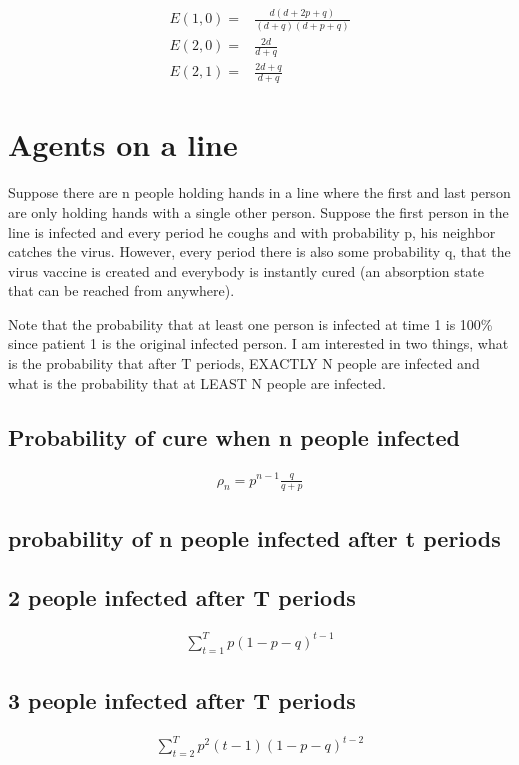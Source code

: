 \documentclass[12pt]{report}
\numberwithin{equation}{section}
\begin{document}
\begin{align*}
E(1,0) = & \frac{d(d+2p+q)}{(d+q)(d+p+q)} \\
E(2,0) = & \frac{2d}{d+q} \\
E(2,1) = & \frac{2d+q}{d+q} 
\end{align*}

\section{Agents on a line}

Suppose there are n people holding hands in a line where the first and last person are only holding hands with a single other person. Suppose the first person in the line is infected and every period he coughs and with probability p, his neighbor catches the virus. However, every period there is also some probability q, that the virus vaccine is created and everybody is instantly cured (an absorption state that can be reached from anywhere).

Note that the probability that at least one person is infected at time 1 is 100\% since patient 1 is the original infected person. I am interested in two things, what is the probability that after T periods, EXACTLY N people are infected and what is the probability that at LEAST N people are infected.


\subsection{Probability of cure when n people infected}

\begin{align}
\rho_n = p^{n-1}\frac{q}{q+p}
\end{align}

\subsection{probability of n people infected after t periods}

\subsection{2 people infected after T periods}

\begin{align}
 \sum_{t=1}^{T}p(1-p-q)^{t-1}
\end{align}

\subsection{3 people infected after T periods}
\begin{align}
\sum_{t=2}^{T}p^2(t-1)(1-p-q)^{t-2}
\end{align}
\end{document}
